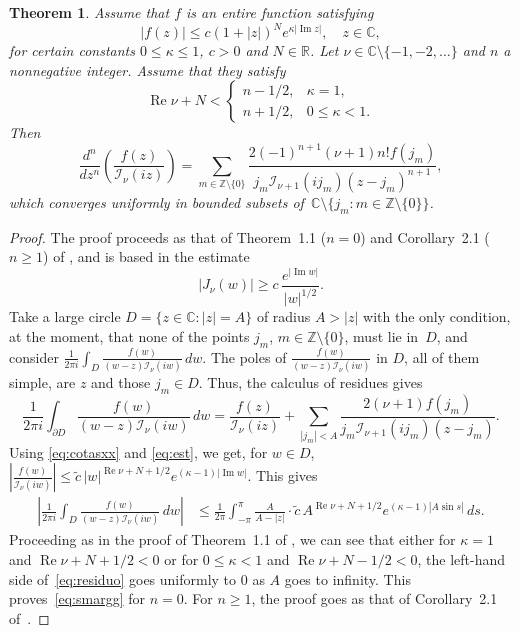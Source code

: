\documentclass[10pt,a4paper]{article}
\numberwithin{equation}{section}
\theoremstyle{plain}
\newtheorem{Theo}{Theorem}[section]
\theoremstyle{definition}
\newcommand{\I}{\mathcal{I}}
\newcommand{\RR}{\mathbb{R}}
\newcommand{\CC}{\mathbb{C}}
\newcommand{\ZZO}{\mathbb{Z} \setminus \{0\}}
\renewcommand{\Im}{\operatorname{Im}}
\renewcommand{\Re}{\operatorname{Re}}
\begin{document}
\begin{Theo}
\label{theo:tscoj}
Assume that $f$ is an entire function satisfying
\begin{equation}
\label{eq:est}
   |f(z)| \le c(1+|z|)^Ne^{\kappa |\Im z|}, \quad z\in \CC,
\end{equation}
for certain constants $0\le \kappa\le 1$, $c>0$ and $N\in \RR$.
Let $\nu \in \CC\setminus \{-1,-2,\dots \}$ and $n$ a nonnegative integer. Assume that they satisfy
\[
   \Re \nu +N < \begin{cases}
   n-1/2, &\kappa =1,
   \\
   n+1/2, &0\le \kappa<1.
   \end{cases}
\]
Then
\begin{equation}
\label{eq:smargg}
   \frac{d^n}{dz^n} \left(\frac{f(z)}{\I_{\nu}(iz)}\right)
   = \sum_{m\in\ZZO} \frac{2(-1)^{n+1}(\nu+1)n!f(j_m)}{j_m\I_{\nu+1}(ij_m)(z-j_m)^{n+1}},
\end{equation}
which converges uniformly in bounded subsets of~$\CC \setminus \{j_m : m\in \ZZO\}$.
\end{Theo}

\begin{proof}
The proof proceeds as that of Theorem~1.1 ($n=0$) and Corollary~2.1 ($n\ge 1$) of \cite{DPV}, and is based in the estimate
\begin{equation}
\label{eq:cotasxx}
  |J_\nu (w)| \ge c\,\frac{e^{|\Im w|}}{|w|^{1/2}}.
\end{equation}
Take a large circle $D=\{z\in \CC : |z| = A\}$ of radius $A>|z|$ with the only condition, at the moment, that none of the points $j_m$, $m\in \ZZO$, must lie in~$D$, and consider
$\frac{1}{2\pi i} \int_{D} \frac{f(w)}{(w-z)\I_{\nu}(iw)}\, dw$.
The poles of $\frac{f(w)}{(w-z)\I_{\nu}(iw)}$ in $D$, all of them simple, are $z$ and those $j_m \in D$.
Thus, the calculus of residues gives
\begin{equation}
\label{eq:residuo}
   \frac{1}{2\pi i} \int_{\partial D}
   \frac{f(w)}{(w-z)\I_{\nu}(iw)} \, dw
   = \frac{f(z)}{\I_{\nu}(iz)} + \sum_{|j_m| <A}
   \frac{2(\nu+1)f(j_m)}{j_m\I_{\nu+1}(ij_m)(z-j_m)}.
\end{equation}
Using \eqref{eq:cotasxx} and \eqref{eq:est}, we get, for $w\in D$, $\left|\frac{f(w)}{\I_{\nu}(iw)}\right| \le \tilde c\, |w|^{\Re \nu+N+1/2}e^{(\kappa-1)|\Im w|}$.
This gives
\begin{align*}
   \left|
   \frac{1}{2\pi i} \int_{D}
   \frac{f(w)}{(w-z)\I_{\nu}(iw)}\, dw
   \right|
   &\leq \frac{1}{2\pi} \int_{-\pi}^{\pi}
   \frac{A}{A - |z|} \cdot
   \tilde{c} \, A^{\Re \nu+N+1/2}e^{(\kappa-1) |A\sin s| } \, ds.
\end{align*}
Proceeding as in the proof of Theorem~1.1 of \cite{DPV}, we can see that either for $\kappa=1$ and $\Re \nu+N+1/2<0 $ or for $0\le \kappa <1$ and $\Re \nu+N-1/2<0$,
the left-hand side of~\eqref{eq:residuo} goes uniformly to $0$ as $A$ goes to infinity. This proves~\eqref{eq:smargg} for $n = 0$.
For $n\ge 1$, the proof goes as that of Corollary~2.1 of~\cite{DPV}.
\end{proof}
\end{document}
